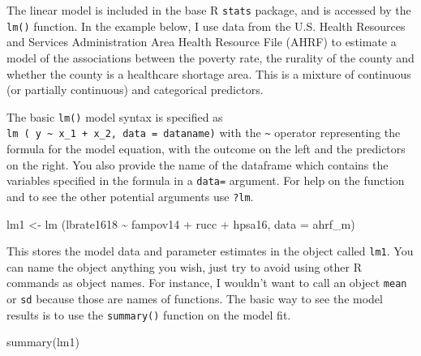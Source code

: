 \documentclass[
]{article}
\newenvironment{Shaded}{\begin{snugshade}}{\end{snugshade}}
\newcommand{\AttributeTok}[1]{\textcolor[rgb]{0.77,0.63,0.00}{#1}}
\newcommand{\FunctionTok}[1]{\textcolor[rgb]{0.00,0.00,0.00}{#1}}
\newcommand{\NormalTok}[1]{#1}
\newcommand{\OtherTok}[1]{\textcolor[rgb]{0.56,0.35,0.01}{#1}}
\newcommand{\SpecialCharTok}[1]{\textcolor[rgb]{0.00,0.00,0.00}{#1}}
\begin{document}
The linear model is included in the base R \texttt{stats} package, and is accessed by the \texttt{lm()} function. In the example below, I use data from the U.S. Health Resources and Services Administration Area Health Resource File (AHRF) to estimate a model of the associations between the poverty rate, the rurality of the county and whether the county is a healthcare shortage area. This is a mixture of continuous (or partially continuous) and categorical predictors.

The basic \texttt{lm()} model syntax is specified as \texttt{lm\ (\ y\ \textasciitilde{}\ x\_1\ +\ x\_2,\ data\ =\ dataname)} with the \texttt{\textasciitilde{}} operator representing the formula for the model equation, with the outcome on the left and the predictors on the right. You also provide the name of the dataframe which contains the variables specified in the formula in a \texttt{data=} argument. For help on the function and to see the other potential arguments use \texttt{?lm}.

\begin{Shaded}
\begin{Highlighting}[]
\NormalTok{lm1 }\OtherTok{\textless{}{-}} \FunctionTok{lm}\NormalTok{ (lbrate1618 }\SpecialCharTok{\textasciitilde{}}\NormalTok{  fampov14 }\SpecialCharTok{+}\NormalTok{ rucc }\SpecialCharTok{+}\NormalTok{ hpsa16, }\AttributeTok{data =}\NormalTok{ ahrf\_m)}
\end{Highlighting}
\end{Shaded}

This stores the model data and parameter estimates in the object called \texttt{lm1}. You can name the object anything you wish, just try to avoid using other R commands as object names. For instance, I wouldn't want to call an object \texttt{mean} or \texttt{sd} because those are names of functions. The basic way to see the model results is to use the \texttt{summary()} function on the model fit.

\begin{Shaded}
\begin{Highlighting}[]
\FunctionTok{summary}\NormalTok{(lm1)}
\end{Highlighting}
\end{Shaded}
\end{document}
